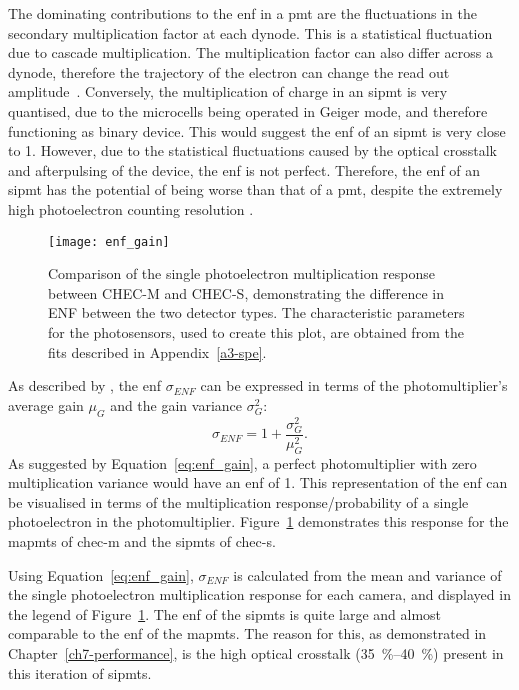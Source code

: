 The dominating contributions to the \gls{enf} in a \gls{pmt} are the fluctuations in the secondary multiplication factor at each dynode. This is a statistical fluctuation due to cascade multiplication. The multiplication factor can also differ across a dynode, therefore the trajectory of the electron can change the read out amplitude~\cite{HAMAMATSU2007}. Conversely, the multiplication of charge in an \gls{sipmt} is very quantised, due to the microcells being operated in Geiger mode, and therefore functioning as binary device. This would suggest the \gls{enf} of an \gls{sipmt} is very close to 1. However, due to the statistical fluctuations caused by the optical crosstalk and afterpulsing of the device, the \gls{enf} is not perfect. Therefore, the \gls{enf} of an \gls{sipmt} has the potential of being worse than that of a \gls{pmt}, despite the extremely high photoelectron counting resolution \cite{Vinogradov2012}.

\begin{figure}
	\centering
    \texttt{[image: enf\_gain]} 
	\caption[Comparison of the single photoelectron multiplication response between CHEC-M and CHEC-S.]{Comparison of the single photoelectron multiplication response between CHEC-M and CHEC-S, demonstrating the difference in ENF between the two detector types. The characteristic parameters for the photosensors, used to create this plot, are obtained from the fits described in Appendix~\ref{a3-spe}.}
	\label{fig:enf_gain}
\end{figure}

As described by \textcite{Teich1986}, the \gls{enf} $\sigma_{ENF}$ can be expressed in terms of the photomultiplier's average gain $\mu_G$ and the gain variance $\sigma_G^2$:
\begin{equation} \label{eq:enf_gain}
\sigma_{ENF} = 1 + \frac{\sigma_G^2}{\mu_G^2}.
\end{equation}
As suggested by Equation~\ref{eq:enf_gain}, a perfect photomultiplier with zero multiplication variance would have an \gls{enf} of 1. This representation of the \gls{enf} can be visualised in terms of the multiplication response/probability of a single photoelectron in the photomultiplier. Figure~\ref{fig:enf_gain} demonstrates this response for the \glspl{mapmt} of \gls{chec-m} and the \glspl{sipmt} of \gls{chec-s}. 

Using Equation~\ref{eq:enf_gain}, $\sigma_{ENF}$ is calculated from the mean and variance of the single photoelectron multiplication response for each camera, and displayed in the legend of Figure~\ref{fig:enf_gain}. The \gls{enf} of the \glspl{sipmt} is quite large and almost comparable to the \gls{enf} of the \glspl{mapmt}. The reason for this, as demonstrated in Chapter~\ref{ch7-performance}, is the high optical crosstalk (\SIrange{35}{40}{\percent}) present in this iteration of \glspl{sipmt}.

